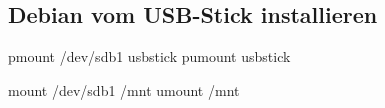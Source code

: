 \subsection{Debian vom USB-Stick installieren}

pmount /dev/sdb1 usbstick
pumount usbstick

mount /dev/sdb1 /mnt
umount /mnt

